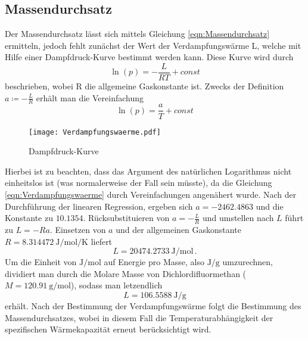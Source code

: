 \subsection{Massendurchsatz}
Der Massendurchsatz lässt sich mittels Gleichung \eqref{eqn:Massendurchsatz} ermitteln, jedoch fehlt zunächst der Wert der Verdampfungswärme L, welche 
mit Hilfe einer Dampfdruck-Kurve bestimmt werden kann. Diese Kurve wird durch 
\begin{equation}
  \ln (p) = -\frac{L}{RT} + const \label{eqn:Verdampfungswaerme}
\end{equation}
beschrieben, wobei R die allgemeine Gaskonstante ist. Zwecks der Definition $a \coloneq -\frac{L}{R}$ erhält man die Vereinfachung
\begin{equation}
  \ln (p) = \frac{a}{T} + const
\end{equation}
\begin{figure}
  \centering
  \texttt{[image: Verdampfungswaerme.pdf]}
  \caption{Dampfdruck-Kurve}
  \label{fig:Dampfdruck}
\end{figure}
Hierbei ist zu beachten, dass das Argument des natürlichen Logarithmus nicht einheitslos ist (was normalerweise
der Fall sein müsste), da die Gleichung \eqref{eqn:Verdampfungswaerme} durch Vereinfachungen angenähert wurde.
Nach der Durchführung der linearen Regression, ergeben sich $a = -2462.4863$ und die Konstante zu $10.1354$.
Rücksubstituieren von $a = -\frac{L}{R}$ und umstellen nach $L$ führt zu $ L = - Ra$. Einsetzen von $a$ und der allgemeinen Gaskonstante 
$R = \SI{8.314472}{\joule\per\mole\per\kelvin}$ liefert
\begin{equation}
  L = \SI{20474.2733}{\joule\per\mol}\, .
\end{equation}
Um die Einheit von $\si{\joule\per\mole}$ auf Energie pro Masse, also $\si{\joule\per\gram}$ umzurechnen, dividiert man durch die Molare
Masse von Dichlordifluormethan ($M = \SI{120.91}{\gram\per\mole}$), sodass man letzendlich
\begin{equation}
  L = \SI{106.5588}{\joule\per\gram}
\end{equation}
erhält.
Nach der Bestimmung der Verdampfungswärme folgt die Bestimmung des Massendurchsatzes,
wobei in diesem Fall die Temperaturabhängigkeit der spezifischen Wärmekapazität erneut berücksichtigt wird.
